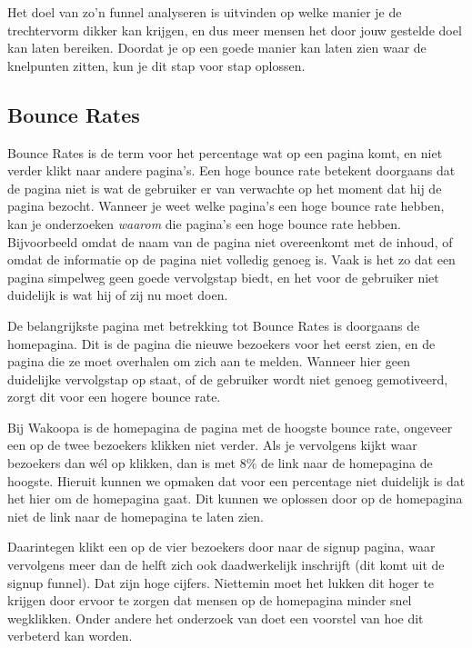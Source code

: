 \documentclass[a4paper, 10pt, pdftex]{report}
\begin{document}
    Het doel van zo'n funnel analyseren is uitvinden op welke manier je de trechtervorm dikker kan krijgen, en dus meer mensen het door jouw gestelde doel kan laten bereiken. Doordat je op een goede manier kan laten zien waar de knelpunten zitten, kun je dit stap voor stap oplossen.

    \subsection{Bounce Rates}
    Bounce Rates is de term voor het percentage wat op een pagina komt, en niet verder klikt naar andere pagina's. Een hoge bounce rate betekent doorgaans dat de pagina niet is wat de gebruiker er van verwachte op het moment dat hij de pagina bezocht. Wanneer je weet welke pagina's een hoge bounce rate hebben, kan je onderzoeken \emph{waarom} die pagina's een hoge bounce rate hebben. Bijvoorbeeld omdat de naam van de pagina niet overeenkomt met de inhoud, of omdat de informatie op de pagina niet volledig genoeg is. Vaak is het zo dat een pagina simpelweg geen goede vervolgstap biedt, en het voor de gebruiker niet duidelijk is wat hij of zij nu moet doen.

    De belangrijkste pagina met betrekking tot Bounce Rates is doorgaans de homepagina. Dit is de pagina die nieuwe bezoekers voor het eerst zien, en de pagina die ze moet overhalen om zich aan te melden. Wanneer hier geen duidelijke vervolgstap op staat, of de gebruiker wordt niet genoeg gemotiveerd, zorgt dit voor een hogere bounce rate.

    Bij Wakoopa is de homepagina de pagina met de hoogste bounce rate, ongeveer een op de twee bezoekers klikken niet verder. Als je vervolgens kijkt waar bezoekers dan w\'el op klikken, dan is met 8\% de link naar de homepagina de hoogste. Hieruit kunnen we opmaken dat voor een percentage niet duidelijk is dat het hier om de homepagina gaat. Dit kunnen we oplossen door op de homepagina niet de link naar de homepagina te laten zien.

    Daarintegen klikt een op de vier bezoekers door naar de signup pagina, waar vervolgens meer dan de helft zich ook daadwerkelijk inschrijft (dit komt uit de signup funnel). Dat zijn hoge cijfers. Niettemin moet het lukken dit hoger te krijgen door ervoor te zorgen dat mensen op de homepagina minder snel wegklikken. Onder andere het onderzoek van \cite{Hoekman2008} doet een voorstel van hoe dit verbeterd kan worden.
\end{document}
